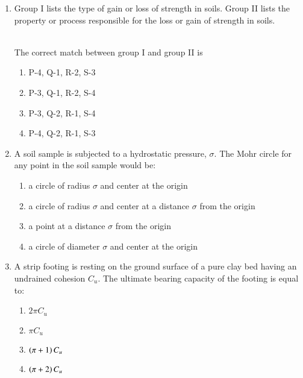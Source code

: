 \documentclass[journal,9pt,onecolumn]{IEEEtran}
\begin{document}
\begin{enumerate}
 \item Group I lists the type of gain or loss of strength in soils. Group II lists the property or process responsible for the loss or gain of strength in soils.
\begin{table}[h!]
    \centering
    
    \label{tab:CE-2017}
\end{table}\\
The correct match between group I and group II is
\begin{multicols}{2}
 \begin{enumerate}
        \item P-4, Q-1, R-2, S-3
        \item P-3, Q-1, R-2, S-4
        \item P-3, Q-2, R-1, S-4
        \item P-4, Q-2, R-1, S-3
    \end{enumerate}
\end{multicols}

    
\item A soil sample is subjected to a hydrostatic pressure, $\sigma$. The Mohr circle for any point in the soil sample would be:
    \begin{enumerate}
        \item a circle of radius $\sigma$ and center at the origin
        \item a circle of radius $\sigma$ and center at a distance $\sigma$ from the origin
        \item a point at a distance $\sigma$ from the origin
        \item a circle of diameter $\sigma$ and center at the origin
    \end{enumerate}

\item A strip footing is resting on the ground surface of a pure clay bed having an undrained cohesion $C_u$. The ultimate bearing capacity of the footing is equal to:
\begin{multicols}{4}
\begin{enumerate}
    \item $2\pi C_u$
    \item $\pi C_u$
    \item $\left(\pi + 1\right) C_u$
    \item $\left(\pi + 2\right) C_u$
\end{enumerate}
\end{multicols}



\end{enumerate}
\end{document}
